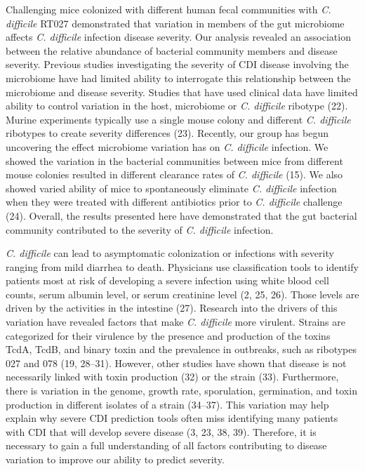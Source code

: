 \documentclass[
  12pt,
]{article}
\begin{document}
Challenging mice colonized with different human fecal communities with
\emph{C. difficile} RT027 demonstrated that variation in members of the
gut microbiome affects \emph{C. difficile} infection disease severity.
Our analysis revealed an association between the relative abundance of
bacterial community members and disease severity. Previous studies
investigating the severity of CDI disease involving the microbiome have
had limited ability to interrogate this relationship between the
microbiome and disease severity. Studies that have used clinical data
have limited ability to control variation in the host, microbiome or
\emph{C. difficile} ribotype (22). Murine experiments typically use a
single mouse colony and different \emph{C. difficile} ribotypes to
create severity differences (23). Recently, our group has begun
uncovering the effect microbiome variation has on \emph{C. difficile}
infection. We showed the variation in the bacterial communities between
mice from different mouse colonies resulted in different clearance rates
of \emph{C. difficile} (15). We also showed varied ability of mice to
spontaneously eliminate \emph{C. difficile} infection when they were
treated with different antibiotics prior to \emph{C. difficile}
challenge (24). Overall, the results presented here have demonstrated
that the gut bacterial community contributed to the severity of \emph{C.
difficile} infection.

\emph{C. difficile} can lead to asymptomatic colonization or infections
with severity ranging from mild diarrhea to death. Physicians use
classification tools to identify patients most at risk of developing a
severe infection using white blood cell counts, serum albumin level, or
serum creatinine level (2, 25, 26). Those levels are driven by the
activities in the intestine (27). Research into the drivers of this
variation have revealed factors that make \emph{C. difficile} more
virulent. Strains are categorized for their virulence by the presence
and production of the toxins TcdA, TcdB, and binary toxin and the
prevalence in outbreaks, such as ribotypes 027 and 078 (19, 28--31).
However, other studies have shown that disease is not necessarily linked
with toxin production (32) or the strain (33). Furthermore, there is
variation in the genome, growth rate, sporulation, germination, and
toxin production in different isolates of a strain (34--37). This
variation may help explain why severe CDI prediction tools often miss
identifying many patients with CDI that will develop severe disease (3,
23, 38, 39). Therefore, it is necessary to gain a full understanding of
all factors contributing to disease variation to improve our ability to
predict severity.
\end{document}

